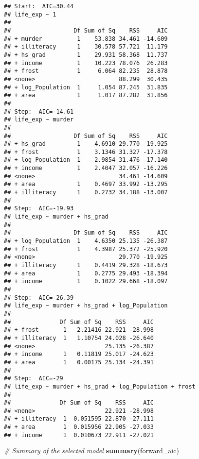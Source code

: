 \documentclass[
]{article}
\newenvironment{Shaded}{\begin{snugshade}}{\end{snugshade}}
\newcommand{\CommentTok}[1]{\textcolor[rgb]{0.56,0.35,0.01}{\textit{#1}}}
\newcommand{\FunctionTok}[1]{\textcolor[rgb]{0.13,0.29,0.53}{\textbf{#1}}}
\newcommand{\NormalTok}[1]{#1}
\begin{document}
\begin{verbatim}
## Start:  AIC=30.44
## life_exp ~ 1
## 
##                  Df Sum of Sq    RSS     AIC
## + murder          1    53.838 34.461 -14.609
## + illiteracy      1    30.578 57.721  11.179
## + hs_grad         1    29.931 58.368  11.737
## + income          1    10.223 78.076  26.283
## + frost           1     6.064 82.235  28.878
## <none>                        88.299  30.435
## + log_Population  1     1.054 87.245  31.835
## + area            1     1.017 87.282  31.856
## 
## Step:  AIC=-14.61
## life_exp ~ murder
## 
##                  Df Sum of Sq    RSS     AIC
## + hs_grad         1    4.6910 29.770 -19.925
## + frost           1    3.1346 31.327 -17.378
## + log_Population  1    2.9854 31.476 -17.140
## + income          1    2.4047 32.057 -16.226
## <none>                        34.461 -14.609
## + area            1    0.4697 33.992 -13.295
## + illiteracy      1    0.2732 34.188 -13.007
## 
## Step:  AIC=-19.93
## life_exp ~ murder + hs_grad
## 
##                  Df Sum of Sq    RSS     AIC
## + log_Population  1    4.6350 25.135 -26.387
## + frost           1    4.3987 25.372 -25.920
## <none>                        29.770 -19.925
## + illiteracy      1    0.4419 29.328 -18.673
## + area            1    0.2775 29.493 -18.394
## + income          1    0.1022 29.668 -18.097
## 
## Step:  AIC=-26.39
## life_exp ~ murder + hs_grad + log_Population
## 
##              Df Sum of Sq    RSS     AIC
## + frost       1   2.21416 22.921 -28.998
## + illiteracy  1   1.10754 24.028 -26.640
## <none>                    25.135 -26.387
## + income      1   0.11819 25.017 -24.623
## + area        1   0.00175 25.134 -24.391
## 
## Step:  AIC=-29
## life_exp ~ murder + hs_grad + log_Population + frost
## 
##              Df Sum of Sq    RSS     AIC
## <none>                    22.921 -28.998
## + illiteracy  1  0.051595 22.870 -27.111
## + area        1  0.015956 22.905 -27.033
## + income      1  0.010673 22.911 -27.021
\end{verbatim}

\begin{Shaded}
\begin{Highlighting}[]
\CommentTok{\# Summary of the selected model}
\FunctionTok{summary}\NormalTok{(forward\_aic)}
\end{Highlighting}
\end{Shaded}
\end{document}
